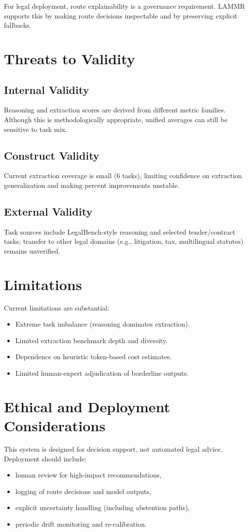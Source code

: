 For legal deployment, route explainability is a governance requirement. LAMMR supports this by making route decisions inspectable and by preserving explicit fallbacks.

\section{Threats to Validity}
\subsection{Internal Validity}
Reasoning and extraction scores are derived from different metric families. Although this is methodologically appropriate, unified averages can still be sensitive to task mix.

\subsection{Construct Validity}
Current extraction coverage is small (6 tasks), limiting confidence on extraction generalization and making percent improvements unstable.

\subsection{External Validity}
Task sources include LegalBench-style reasoning and selected tender/contract tasks; transfer to other legal domains (e.g., litigation, tax, multilingual statutes) remains unverified.

\section{Limitations}
Current limitations are substantial:
\begin{itemize}[leftmargin=*]
  \item Extreme task imbalance (reasoning dominates extraction).
  \item Limited extraction benchmark depth and diversity.
  \item Dependence on heuristic token-based cost estimates.
  \item Limited human-expert adjudication of borderline outputs.
\end{itemize}

\section{Ethical and Deployment Considerations}
This system is designed for decision support, not automated legal advice. Deployment should include:
\begin{itemize}[leftmargin=*]
  \item human review for high-impact recommendations,
  \item logging of route decisions and model outputs,
  \item explicit uncertainty handling (including abstention paths),
  \item periodic drift monitoring and re-calibration.
\end{itemize}

